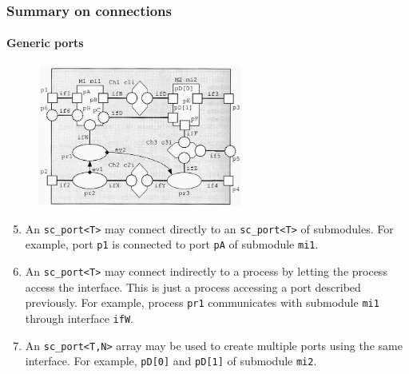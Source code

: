 \begin{frame}
\frametitle{Summary on connections}
\framesubtitle{Generic ports}

\begin{figure}
\includegraphics[width=0.6\textwidth]{lecture12/img/connections.png}
\end{figure}
{\scriptsize
\begin{enumerate}
\setcounter{enumi}{4}
\item An \texttt{sc\_port<T>} may connect directly to an \texttt{sc\_port<T>} of submodules. For example, port \texttt{p1} is connected to port \texttt{pA} of submodule \texttt{mi1}.
\item An \texttt{sc\_port<T>} may connect indirectly to a process by letting the process access the interface. This is just a process accessing a port described previously. For example, process \texttt{pr1} communicates with submodule \texttt{mi1} through interface \texttt{ifW}.
\item An \texttt{sc\_port<T,N>} array may be used to create multiple ports using the same interface. For example, \texttt{pD[0]} and \texttt{pD[1]} of submodule \texttt{mi2}.
\end{enumerate}
}
\end{frame}

